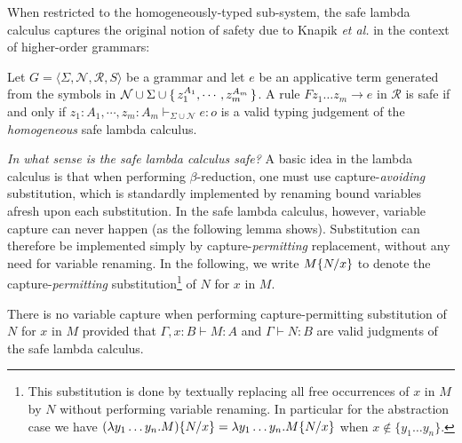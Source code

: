 When restricted to the homogeneously-typed
sub-system, the safe lambda calculus captures the original notion
of safety due to Knapik \emph{et al.} in the context of higher-order
grammars:

\begin{proposition} Let $G = \langle \Sigma, \mathcal{N}, \mathcal{R},
  S \rangle$ be a grammar and let $e$ be an applicative term generated
  from the symbols in $\mathcal{N} \cup \Sigma \cup \{\,{z_1^{A_1},
    \cdots, z_m^{A_m}}\,\}$.  A rule $F z_1 \ldots z_m \rightarrow e$ in
  $\mathcal{R}$ is safe if and only if $ z_1 : A_1, \cdots, z_m : A_m
  \vdash_{\Sigma \cup \mathcal{N}} e : o$ is a valid typing judgement
  of the \emph{homogeneous} safe lambda calculus.
\end{proposition}

\emph{In what sense is the safe lambda calculus safe?} A basic idea
in the lambda calculus is that when performing $\beta$-reduction, one
must use capture-\emph{avoiding} substitution, which is standardly
implemented by renaming bound variables afresh upon each substitution.
In the safe lambda calculus, however, variable capture can never
happen (as the following lemma shows). Substitution can therefore be
implemented simply by capture-\emph{permitting} replacement, without
any need for variable renaming. In the following, we write
$M\{N/x \}$ to denote the capture-\emph{permitting}
substitution\footnote{This substitution is done by
textually replacing all free occurrences of $x$ in $M$ by $N$ without performing variable renaming.  In particular for the abstraction
  case we have
$(\lambda y_1\ldots y_n . M)\{N/x \} = \lambda y_1\ldots y_n . M\{N/x \}$ when $x\not\in
  \{ y_1\ldots y_n \}$.}
of $N$ for $x$ in $M$.

\begin{lemma}\label{lem:nvc}
\label{lem:homog_nocapture} There is
no variable capture when performing capture-permitting
substitution of $N$ for $x$ in $M$
provided that $\Gamma, x:B \vdash M : A$ and $\Gamma \vdash  N : B$ are valid judgments of the safe lambda calculus.
\end{lemma}


